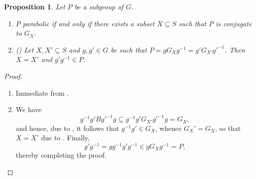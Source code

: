 \documentclass{article}
\theoremstyle{thmstyle}
\newtheorem{proposition}[theorem]{Proposition}
\theoremstyle{defstyle}
\begin{document}
\begin{proposition}
    Let $P$ be a subgroup of $G$.
    \begin{enumerate}[label=(\roman*)]
        \item $P$ parabolic if and only if there exists a subset $X\subseteq S$ such that $P$ is conjugate to $G_X$. 
        \item \big(\cite[2.3.4]{macdonald-spherical-functions}\big) Let $X, X'\subseteq S$ and $g,g'\in G$ be such that $P = gG_X g^{-1} = g' G_{X'}g'^{-1}$. Then $X = X'$ and $g'g^{-1}\in P$.
    \end{enumerate}
\end{proposition}
\begin{proof}
\begin{enumerate}[label=(\roman*)]
\item Immediate from .
\item We have 
\begin{equation*}
    g^{-1}g' Bg'^{-1}g\subseteq g^{-1}g' G_{X'}g'^{-1}g = G_X,
\end{equation*}
and hence, due to , it follows that $g^{-1}g'\in G_X$, whence $G_X' = G_X$, so that $X = X'$ due to . Finally,
\begin{equation*}
    g'g^{-1} = gg^{-1}g'g^{-1}\in gG_Xg^{-1} = P,
\end{equation*}
thereby completing the proof. \qedhere
\end{enumerate}
\end{proof}
\end{document}
